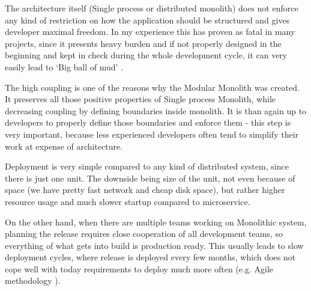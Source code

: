 The architecture itself (Single process or distributed monolith) does not enforce any kind of restriction on how the application should be structured and gives developer maximal freedom. In my experience this has proven as fatal in many projects, since it presents heavy burden and if not properly designed in the beginning and kept in check during the whole development cycle, it can very easily lead to `Big ball of mud' \cite{BIG_BALL_OF_MUD}.

The high coupling is one of the reasons why the Modular Monolith was created. It preserves all those positive properties of Single process Monolith, while decreasing coupling by defining boundaries inside monolith. It is than again up to developers to properly define those boundaries and enforce them - this step is very important, because less experienced developers often tend to simplify their work at expense of architecture.

Deployment is very simple compared to any kind of distributed system, since there is just one unit. The downside being size of the unit, not even because of space (we have pretty fast network and cheap disk space), but rather higher resource usage and much slower startup compared to microservice.

On the other hand, when there are multiple teams working on Monolithic system, planning the release requires close cooperation of all development teams, so everything of what gets into build is production ready. This usually leads to slow deployment cycles, where release is deployed every few months, which does not cope well with today requirements to deploy much more often (e.g. Agile methodology \cite{AGILE_MANIFESTO}).

